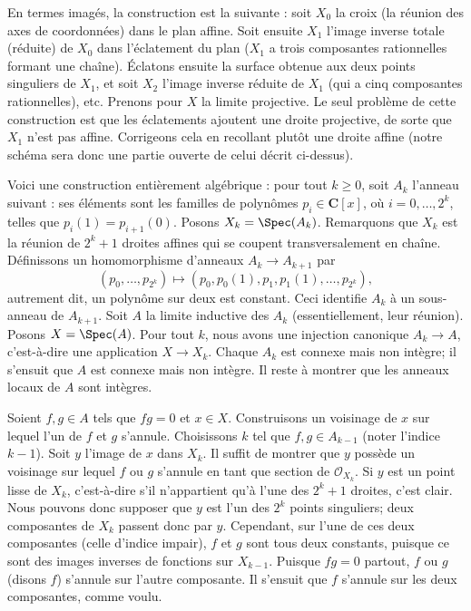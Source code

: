 \medskip\noindent
En termes imagés, la construction est la suivante : soit $X_0$ la croix
(la réunion des axes de coordonnées) dans le plan affine. Soit ensuite $X_1$
l'image inverse totale (réduite) de $X_0$ dans l'éclatement du plan ($X_1$
a trois composantes rationnelles formant une chaîne).  Éclatons ensuite la
surface obtenue aux deux points singuliers de $X_1$, et soit $X_2$
l'image inverse réduite de $X_1$ (qui a cinq composantes rationnelles), etc.
Prenons pour $X$ la limite projective. Le seul problème de cette construction
est que les éclatements ajoutent une droite projective, de sorte que $X_1$ n'est pas affine.
Corrigeons cela en recollant plutôt une droite affine (notre schéma sera donc une
partie ouverte de celui décrit ci-dessus).

\medskip\noindent
Voici une construction entièrement algébrique : pour tout $k \ge 0$, soit $A_k$
l'anneau suivant : ses éléments sont les familles de
polynômes $p_i \in \mathbf{C}[x]$, où $i = 0, \ldots, 2^k$, telles que
$p_i(1) = p_{i + 1}(0)$. Posons $X_k = \Spec(A_k)$. Remarquons que $X_k$ est
la réunion de $2^k + 1$ droites affines qui se coupent transversalement en chaîne.
Définissons un homomorphisme d'anneaux $A_k \to A_{k + 1}$ par
$$
(p_0, \ldots, p_{2^k})
\longmapsto
(p_0, p_0(1), p_1, p_1(1), \ldots, p_{2^k}),
$$
autrement dit, un polynôme sur deux est constant. Ceci identifie
$A_k$ à un sous-anneau de $A_{k + 1}$. Soit $A$ la limite inductive des $A_k$
(essentiellement, leur réunion). Posons $X = \Spec(A)$. Pour tout $k$, nous avons
une injection canonique $A_k \to A$, c'est-à-dire une application $X\to X_k$.
Chaque $A_k$ est connexe mais non intègre; il s'ensuit que $A$ est
connexe mais non intègre. Il reste à montrer que les anneaux locaux de
$A$ sont intègres.

\medskip\noindent
Soient $f, g \in A$ tels que $fg = 0$ et $x \in X$. Construisons un
voisinage de $x$ sur lequel l'un de $f$ et $g$ s'annule. Choisissons $k$
tel que $f, g \in A_{k - 1}$ (noter l'indice $k - 1$).
Soit $y$ l'image de $x$ dans $X_k$. Il suffit de montrer que $y$ possède
un voisinage sur lequel $f$ ou $g$ s'annule en tant que section de
$\mathcal{O}_{X_k}$.
Si $y$ est un point lisse de $X_k$, c'est-à-dire s'il n'appartient qu'à l'une des
$2^k + 1$ droites, c'est clair. Nous pouvons donc supposer que $y$ est l'un
des $2^k$ points singuliers; deux composantes de $X_k$ passent donc par
$y$. Cependant, sur l'une de ces deux composantes (celle d'indice impair),
$f$ et $g$ sont tous deux constants, puisque ce sont des images inverses de fonctions sur
$X_{k - 1}$. Puisque $fg = 0$ partout, $f$ ou $g$ (disons $f$)
s'annule sur l'autre composante.
Il s'ensuit que $f$ s'annule sur les deux composantes, comme voulu.






